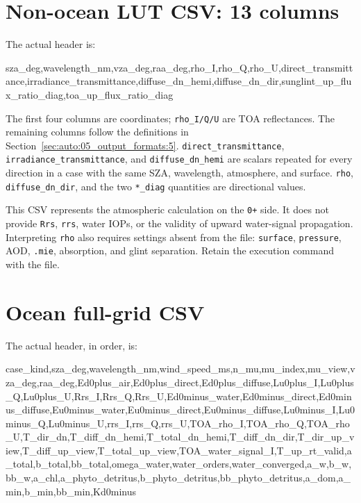 \section{Non-ocean LUT CSV: 13 columns}
\label{sec:auto:05_output_formats:6}
The actual header is:


\begin{ManualCode}
sza_deg,wavelength_nm,vza_deg,raa_deg,rho_I,rho_Q,rho_U,direct_transmittance,irradiance_transmittance,diffuse_dn_hemi,diffuse_dn_dir,sunglint_up_flux_ratio_diag,toa_up_flux_ratio_diag
\end{ManualCode}

The first four columns are coordinates; \texttt{rho\_\allowbreak{}I/\allowbreak{}Q/\allowbreak{}U} are TOA reflectances. The remaining columns follow the definitions in Section~\ref{sec:auto:05_output_formats:5}. \texttt{direct\_\allowbreak{}transmittance}, \texttt{irradiance\_\allowbreak{}transmittance}, and \texttt{diffuse\_\allowbreak{}dn\_\allowbreak{}hemi} are scalars repeated for every direction in a case with the same SZA, wavelength, atmosphere, and surface. \texttt{rho}, \texttt{diffuse\_\allowbreak{}dn\_\allowbreak{}dir}, and the two \texttt{*\_\allowbreak{}diag} quantities are directional values.

This CSV represents the atmospheric calculation on the \texttt{0+} side. It does not provide \texttt{Rrs}, \texttt{rrs}, water IOPs, or the validity of upward water-signal propagation. Interpreting \texttt{rho} also requires settings absent from the file: \texttt{surface}, \texttt{pressure}, AOD, \texttt{.\allowbreak{}mie}, absorption, and glint separation. Retain the execution command with the file.

\section{Ocean full-grid CSV}
\label{sec:auto:05_output_formats:7}
The actual header, in order, is:


\begin{ManualCode}
case_kind,sza_deg,wavelength_nm,wind_speed_ms,n_mu,mu_index,mu_view,vza_deg,raa_deg,Ed0plus_air,Ed0plus_direct,Ed0plus_diffuse,Lu0plus_I,Lu0plus_Q,Lu0plus_U,Rrs_I,Rrs_Q,Rrs_U,Ed0minus_water,Ed0minus_direct,Ed0minus_diffuse,Eu0minus_water,Eu0minus_direct,Eu0minus_diffuse,Lu0minus_I,Lu0minus_Q,Lu0minus_U,rrs_I,rrs_Q,rrs_U,TOA_rho_I,TOA_rho_Q,TOA_rho_U,T_dir_dn,T_diff_dn_hemi,T_total_dn_hemi,T_diff_dn_dir,T_dir_up_view,T_diff_up_view,T_total_up_view,TOA_water_signal_I,T_up_rt_valid,a_total,b_total,bb_total,omega_water,water_orders,water_converged,a_w,b_w,bb_w,a_chl,a_phyto_detritus,b_phyto_detritus,bb_phyto_detritus,a_dom,a_min,b_min,bb_min,Kd0minus
\end{ManualCode}

